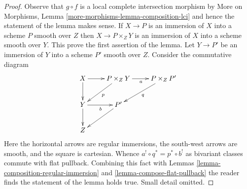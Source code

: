 \documentclass[10pt,a4paper]{amsart}
\theoremstyle{plain}
\theoremstyle{definition}
\theoremstyle{remark}
\numberwithin{equation}{subsection}
\begin{document}
\begin{proof}
Observe that $g \circ f$ is a local complete intersection morphism
by More on Morphisms, Lemma \ref{more-morphisms-lemma-composition-lci}
and hence the statement of the lemma makes sense.
If $X \to P$ is an immersion of $X$ into a scheme $P$ smooth over $Z$
then $X \to P \times_Z Y$ is an immersion of $X$ into a scheme smooth
over $Y$. This prove the first assertion of the lemma.
Let $Y \to P'$ be an immersion of $Y$ into a scheme $P'$ smooth over $Z$.
Consider the commutative diagram
$$
\xymatrix{
X \ar[r] \ar[d] &
P \times_Z Y \ar[r]_a \ar[ld]^p &
P \times_Z P' \ar[ld]^q \\
Y \ar[r]_b \ar[d] &
P' \ar[ld] \\
Z
}
$$
Here the horizontal arrows are regular immersions, the south-west arrows
are smooth, and the square is cartesian. Whence
$a^! \circ q^* = p^* \circ b^!$ as bivariant classes commute
with flat pullback. Combining this fact with
Lemmas \ref{lemma-composition-regular-immersion} and
\ref{lemma-compose-flat-pullback}
the reader finds the statement of the lemma holds true.
Small detail omitted.
\end{proof}
\end{document}
